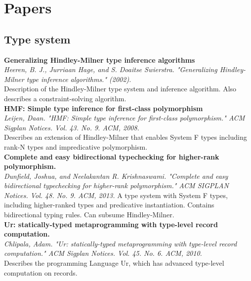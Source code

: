 \documentclass[12pt]{article}
\begin{document}
\section{Papers}

\subsection{Type system}
\textbf{Generalizing Hindley-Milner type inference algorithms} \\
\textit{Heeren, B. J., Jurriaan Hage, and S. Doaitse Swierstra. "Generalizing Hindley-Milner type inference algorithms." (2002).} \\
Description of the Hindley-Milner type system and inference algorithm. Also describes a constraint-solving algorithm.
\\
\textbf{HMF: Simple type inference for first-class polymorphism} \\
\textit{Leijen, Daan. "HMF: Simple type inference for first-class polymorphism." ACM Sigplan Notices. Vol. 43. No. 9. ACM, 2008.} \\
Describes an extension of Hindley-Milner that enables System F types including rank-N types and impredicative polymorphism.
\\
\textbf{Complete and easy bidirectional typechecking for higher-rank polymorphism.} \\
\textit{Dunfield, Joshua, and Neelakantan R. Krishnaswami. "Complete and easy bidirectional typechecking for higher-rank polymorphism." ACM SIGPLAN Notices. Vol. 48. No. 9. ACM, 2013.} 
A type system with System F types, including higher-ranked types and predicative instantiation. Contains bidirectional typing rules. Can subsume Hindley-Milner.
\\
\textbf{Ur: statically-typed metaprogramming with type-level record computation.} \\
\textit{Chlipala, Adam. "Ur: statically-typed metaprogramming with type-level record computation." ACM Sigplan Notices. Vol. 45. No. 6. ACM, 2010.} \\
Describes the programming Language Ur, which has advanced type-level computation on records.
\end{document}
